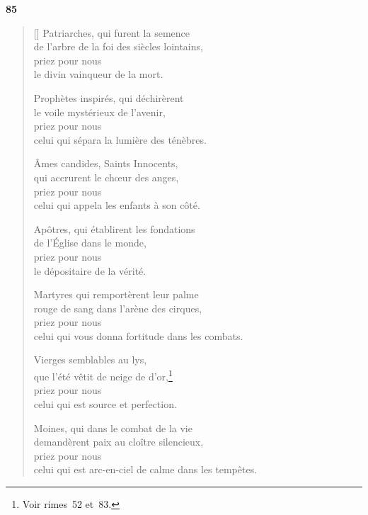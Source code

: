 \documentclass[a4paper,12pt]{book}
\begin{document}
\bigskip

\begin{center}
  \textbf{85}
\end{center}

\settowidth{\versewidth}{celui qui est arc-en-ciel de calme dans les tempêtes.}


\begin{verse}[\versewidth]
  Patriarches, qui furent la semence \\
  de l'arbre de la foi des siècles lointains, \\
  priez pour nous \\
  le divin vainqueur de la mort.

  Prophètes inspirés, qui déchirèrent \\
  le voile mystérieux de l'avenir, \\
  priez pour nous \\
  celui qui sépara la lumière des ténèbres.

  Âmes candides, Saints Innocents, \\
  qui accrurent le chœur des anges, \\
  priez pour nous \\
  celui qui appela les enfants à son côté.

  Apôtres, qui établirent les fondations \\
  de l'Église dans le monde, \\
  priez pour nous \\
  le dépositaire de la vérité.

  Martyres qui remportèrent leur palme \\
  rouge de sang dans l'arène des cirques, \\
  priez pour nous \\
  celui qui vous donna fortitude dans les combats.

  Vierges semblables au lys, \\
  que l'été vêtit de neige de d'or,\footnote{Voir rimes~52 et~83.} \\
  priez pour nous \\
  celui qui est source et perfection.

  Moines, qui dans le combat de la vie \\
  demandèrent paix au cloître silencieux, \\
  priez pour nous \\
  celui qui est arc-en-ciel de calme dans les tempêtes.


\end{verse}
\end{document}

